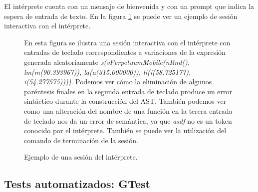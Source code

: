 El intérprete cuenta con un mensaje de bienvenida y con un prompt que indica la espera de entrada de texto. En la figura \ref{fig:interpreter} se puede ver un ejemplo de sesión interactiva con el intérprete.
 
\begin{figure}
    \centering
    \caption{Ejemplo de una sesión del intérprete.} En esta figura se ilustra una sesión interactiva con el intérprete con entradas de teclado correspondientes a variaciones de la expresión generada aleatoriamente \textit{s(vPerpetuumMobile(nRnd(), lm(m(90.393967)), la(a(315.000000)), li(i(58.725177), i(54.277575))))}. Podemos ver cómo la eliminación de algunos paréntesis finales en la segunda entrada de teclado produce un error sintáctico durante la construcción del AST. También podemos ver como una alteración del nombre de una función en la terera entrada de teclado nos da un error de semántica, ya que \textit{asdf} no es un token conocido por el intérprete. También se puede ver la utilización del comando de terminación de la sesión.
    \label{fig:interpreter}
\end{figure}
 
\subsection{Tests automatizados: GTest}


